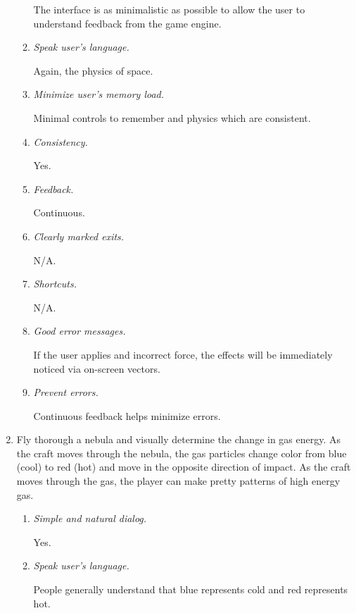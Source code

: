 \begin{enumerate}
\begin{enumerate}
  The interface is as minimalistic as possible to allow the user to understand feedback from the game engine.
  
  \item \emph{Speak user's language.}

  Again, the physics of space.
  
  \item \emph{Minimize user's memory load.}

  Minimal controls to remember and physics which are consistent.
  
  \item \emph{Consistency.}

  Yes.
  
  \item \emph{Feedback.}
  
  Continuous.
  
  \item \emph{Clearly marked exits.}

  N/A.
  
  \item \emph{Shortcuts.}

  N/A.
  
  \item \emph{Good error messages.}

  If the user applies and incorrect force, the effects will be immediately noticed via on-screen vectors.
  
  \item \emph{Prevent errors.}

  Continuous feedback helps minimize errors.
 
\end{enumerate}

  \item Fly thorough a nebula and visually determine the change in gas energy.  As the craft moves through the nebula, the gas particles change color from blue (cool) to red (hot) and move in the opposite direction of impact.  As the craft moves through the gas, the player can make pretty patterns of high energy gas.
\begin{enumerate}
  
  \item \emph{Simple and natural dialog.}

  Yes.
  
  \item \emph{Speak user's language.}
  
  People generally understand that blue represents cold and red represents hot.


\end{enumerate}
\end{enumerate}
